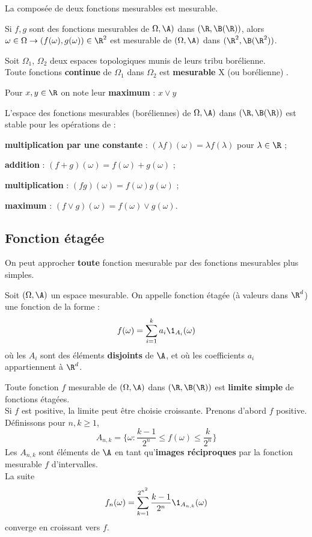 \bp
La composée de deux fonctions mesurables est mesurable.
\ep
\bpf

\epf
    
\bl
Si $f,g$ sont des fonctions mesurables de $\Omega, \A)$ dans $(\R, \B(\R))$, alors $\omega \in \Omega \to (f(\omega),g(\omega)) \in \R^2$ est mesurable de $(\Omega, \A)$ dans $(\R^2, \B(\R^2))$.
\el
\bpf
\epf

\bp
Soit $\Omega_1$, $\Omega_2$ deux espaces topologiques munis de leurs tribu borélienne.\\
Toute fonctions \textbf{continue} de $\Omega_1$ dans $\Omega_2$ est \textbf{mesurable} X (ou borélienne) .
\ep
\bpf
\epf

\bigskip

\bn
Pour $x, y \in \R$ on note leur \textbf{maximum} : $x \lor y$
\en
    
\bp
L'espace des fonctions mesurables (boréliennes) de $\Omega, \A)$ dans $(\R, \B(\R))$ est stable pour les opérations de :
\ben 
    \item \textbf{multiplication par une constante} : $(\lambda f)(\omega) = \lambda f(\lambda)$ pour $\lambda \in \R$ ;
    \item \textbf{addition} : $(f+g)(\omega) = f(\omega) + g(\omega)$ ;
    \item \textbf{multiplication} : $(fg)(\omega) = f(\omega)g(\omega)$ ;
    \item \textbf{maximum} : $(f \lor g)(\omega) = f(\omega) \lor g(\omega)$.
\een
\ep
\bpf
\epf
    
    
\subsection{Fonction étagée}
    
On peut approcher \textbf{toute} fonction mesurable par des fonctions mesurables plus simples.

Soit $(\Omega, \A)$ un espace mesurable. On appelle fonction étagée (à valeurs dans $\R^d$) une fonction de la forme : $$f(\omega) = \sum_{i = 1}^k a_i \1_{A_i}(\omega)$$ où les $A_i$ sont des éléments \textbf{disjoints} de $\A$, et où les coefficients $a_i$ appartiennent à $\R^d$.
\ed
    
\bp
Toute fonction $f$ mesurable de $(\Omega, \A)$ dans $(\R,\B(\R))$ est \textbf{limite simple} de fonctions étagées. \\Si $f$ est positive, la limite peut être choisie croissante.
\ep
\bpf
Prenons d'abord $f$ positive. Définissons pour $n,k \geq 1$, $$A_{n,k} = \{ \omega : \frac{k-1}{2^n} \leq f(\omega) \leq \frac k{2^n} \}$$
Les $A_{n,k}$ sont éléments de $\A$ en tant qu'\textbf{images réciproques} par la fonction mesurable $f$ d'intervalles.\\
La suite $$f_n(\omega)  = \sum_{k = 1}^{2^{n^2}} \frac{k-1}{2^n} \1_{A_{n,k}}(\omega)$$
converge en croissant vers $f$.
\medskip

